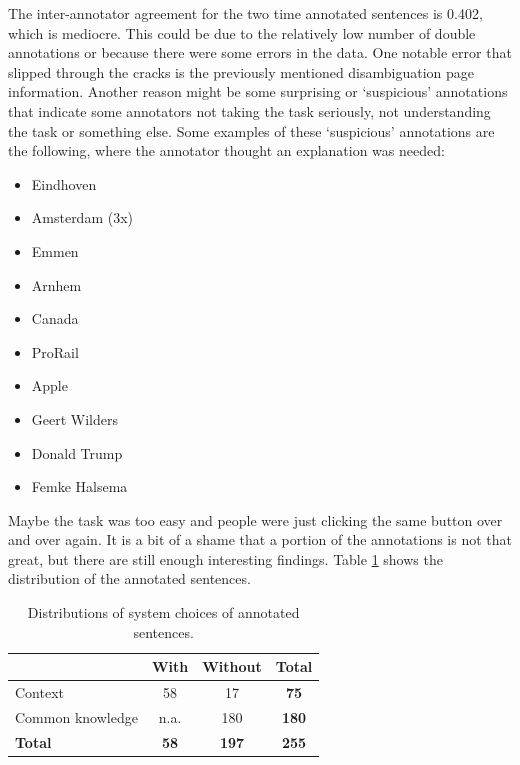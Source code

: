 \documentclass[
10pt, %
a4paper, %
oneside, %
headinclude,footinclude, %
] {book}%
\begin{document}
The inter-annotator agreement for the two time annotated sentences is 0.402, which is mediocre.
This could be due to the relatively low number of double annotations or because there were some errors in the data.
One notable error that slipped through the cracks is the previously mentioned disambiguation page information.
Another reason might be some surprising or `suspicious' annotations that indicate some annotators not taking the task seriously, not understanding the task or something else.
Some examples of these `suspicious' annotations are the following, where the annotator thought an explanation was needed:

\begin{multicols}{2}
  \begin{itemize}
    \item Eindhoven
    \item Amsterdam (3x)
    \item Emmen
    \item Arnhem
    \item Canada
    \item ProRail
    \item Apple
    \item Geert Wilders
    \item Donald Trump
    \item Femke Halsema
  \end{itemize}
\end{multicols}

Maybe the task was too easy and people were just clicking the same button over and over again.
It is a bit of a shame that a portion of the annotations is not that great, but there are still enough interesting findings.
Table \ref{table:annotations} shows the distribution of the annotated sentences.

\begin{table}[hbtp]\centering
  \caption{Distributions of system choices of annotated sentences.\label{table:annotations}}
  \begin{tabular}{l|ccc}
                     & With        & Without      & \textbf{Total} \\
    \hline
    Context          & 58          & 17           & \textbf{75}    \\
    Common knowledge & n.a.        & 180          & \textbf{180}   \\
    \textbf{Total}   & \textbf{58} & \textbf{197} & \textbf{255}   \\
  \end{tabular}
\end{table}
\end{document}
